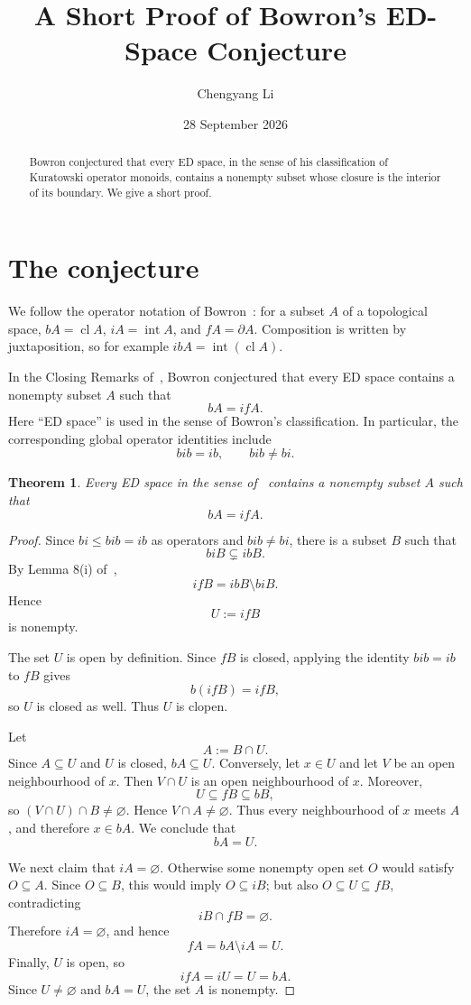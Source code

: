 \documentclass[11pt]{amsart}
\title{A Short Proof of Bowron's ED-Space Conjecture}
\author{Chengyang Li}
\date{28 September 2026}
\newtheorem{theorem}{Theorem}
\newcommand{\cl}{\operatorname{cl}}
\newcommand{\Int}{\operatorname{int}}
\newcommand{\bd}{\partial}
\begin{document}
\begin{abstract}
Bowron conjectured that every ED space, in the sense of his classification of Kuratowski operator monoids, contains a nonempty subset whose closure is the interior of its boundary. We give a short proof.
\end{abstract}

\maketitle

\section{The conjecture}

We follow the operator notation of Bowron~\cite{Bowron2024}: for a subset $A$ of a topological space,
$bA=\cl A$, $iA=\Int A$, and $fA=\bd A$.
Composition is written by juxtaposition, so for example $ibA=\Int(\cl A)$.

In the Closing Remarks of~\cite{Bowron2024}, Bowron conjectured that every ED space contains a nonempty subset $A$ such that
\[
 bA=ifA.
\]
Here ``ED space'' is used in the sense of Bowron's classification. In particular, the corresponding global operator identities include
\[
 bib=ib,\qquad bib\ne bi.
\]

\begin{theorem}
Every ED space in the sense of~\cite{Bowron2024} contains a nonempty subset $A$ such that
\[
 bA=ifA.
\]
\end{theorem}

\begin{proof}
Since $bi\le bib=ib$ as operators and $bib\ne bi$, there is a subset $B$ such that
\[
 biB\subsetneq ibB.
\]
By Lemma 8(i) of~\cite{Bowron2024},
\[
 ifB=ibB\setminus biB.
\]
Hence
\[
 U:=ifB
\]
is nonempty.

The set $U$ is open by definition. Since $fB$ is closed, applying the identity $bib=ib$ to $fB$ gives
\[
 b(ifB)=ifB,
\]
so $U$ is closed as well. Thus $U$ is clopen.

Let
\[
 A:=B\cap U.
\]
Since $A\subseteq U$ and $U$ is closed, $bA\subseteq U$.
Conversely, let $x\in U$ and let $V$ be an open neighbourhood of $x$. Then $V\cap U$ is an open neighbourhood of $x$. Moreover,
\[
 U\subseteq fB\subseteq bB,
\]
so $(V\cap U)\cap B\ne\varnothing$. Hence $V\cap A\ne\varnothing$.
Thus every neighbourhood of $x$ meets $A$, and therefore $x\in bA$. We conclude that
\[
 bA=U.
\]

We next claim that $iA=\varnothing$. Otherwise some nonempty open set $O$ would satisfy $O\subseteq A$. Since $O\subseteq B$, this would imply $O\subseteq iB$; but also $O\subseteq U\subseteq fB$, contradicting
\[
 iB\cap fB=\varnothing.
\]
Therefore $iA=\varnothing$, and hence
\[
 fA=bA\setminus iA=U.
\]
Finally, $U$ is open, so
\[
 ifA=iU=U=bA.
\]
Since $U\ne\varnothing$ and $bA=U$, the set $A$ is nonempty.
\end{proof}
\end{document}
